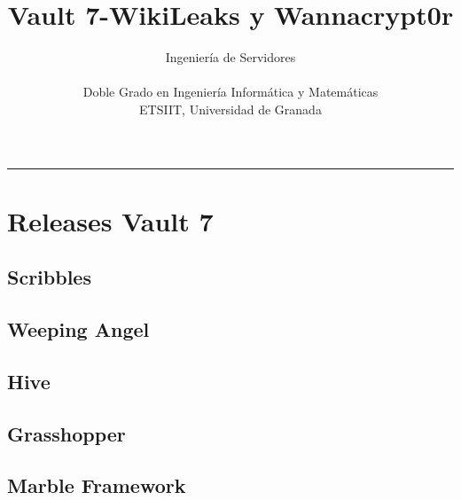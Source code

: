 \documentclass[a4paper,10pt]{article}
\title{\textbf{Vault 7-WikiLeaks y Wannacrypt0r}}
\date{}
\author{Ingeniería de Servidores\\ \\
	\small Doble Grado en Ingeniería Informática y Matemáticas\\
	\small ETSIIT, Universidad de Granada
}
\begin{document}
\newpage %





\maketitle
\vspace*{-1cm}
\begin{center}\rule{0.9\textwidth}{0.1mm} \end{center}
\begin{abstract}

\end{abstract}




\section{Releases Vault 7}
\subsection{Scribbles}

\subsection{Weeping Angel}

\subsection{Hive}

\subsection{Grasshopper}

\subsection{Marble Framework}

\end{document}
